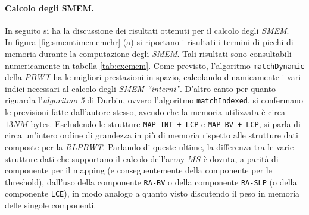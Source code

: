 \paragraph{Calcolo degli SMEM.}
In seguito si ha la discussione dei risultati ottenuti per il calcolo degli
\textit{SMEM}.\\ 
In figura \ref{fig:smemtimememchr} (a) si riportano i risultati i termini di
picchi di 
memoria durante la computazione degli \textit{SMEM}. Tali risultati sono
consultabili numericamente in tabella \ref{tab:exemem}. Come previsto,
l'algoritmo 
\texttt{matchDynamic} della \textit{PBWT} ha le migliori prestazioni
in spazio, calcolando dinamicamente i vari indici necessari al calcolo degli
\textit{SMEM ``interni''}. D'altro canto per quanto riguarda l'\textit{algoritmo
  5} di Durbin, ovvero l'algoritmo \texttt{matchIndexed}, si confermano le
previsioni 
fatte dall'autore stesso, avendo che la memoria utilizzata è circa $13NM$
bytes. Escludendo le strutture \texttt{MAP-INT + LCP} e \texttt{MAP-BV + LCP},
si parla di circa un'intero ordine di grandezza in più di memoria rispetto alle
strutture dati composte per la \textit{RLPBWT}. Parlando di queste ultime, la
differenza tra le varie strutture dati che supportano il calcolo 
dell'array $MS$ è dovuta, a parità di componente per il mapping (e
conseguentemente della componente per le threshold), dall'uso della componente
\texttt{RA-BV} o della componente \texttt{RA-SLP} (o della componente
\texttt{LCE}), in modo analogo a quanto visto discutendo il peso in memoria
delle singole componenti.\\
